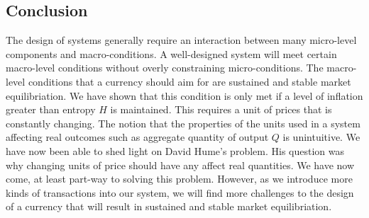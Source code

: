 \subsection{Conclusion}

The design of systems generally require an interaction between many micro-level components and
macro-conditions. A well-designed system will meet certain macro-level conditions without overly
constraining micro-conditions. The macro-level conditions that a currency should aim for are
sustained and stable market equilibriation. We have shown that this condition is only met if a
level of inflation greater than entropy $H$ is maintained. This requires a unit of prices that is
constantly changing. The notion that the properties of the units used in a system affecting real
outcomes such as aggregate quantity of output $Q$ is unintuitive. We have now been able to shed
light on David Hume's problem. His question was why changing units of price should have any affect
real quantities. We have now come, at least part-way to solving this problem. However, as we
introduce more kinds of transactions into our system, we will find more challenges to the design of
a currency that will result in sustained and stable market equilibriation.  

